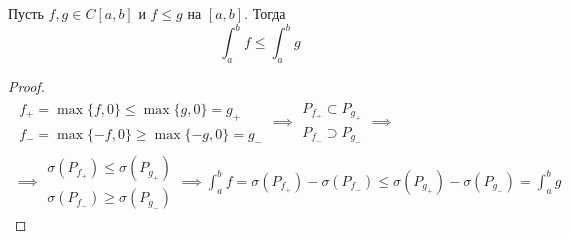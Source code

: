 \begin{theorem}
    Пусть $f, g \in C[a, b]$ и $f \leq g$ на $[a, b]$. Тогда
    \begin{equation*}
        \int_{a}^{b} f \leq \int_{a}^{b} g
    \end{equation*}
\end{theorem}
\begin{proof}
    \begin{equation*}
        \begin{gathered}
            \begin{gathered}
                f_{+} = \max\{f, 0\} \leq \max\{g, 0\} = g_{+} \\
                f_{-} = \max\{-f, 0\} \geq \max\{-g, 0\} = g_{-}
            \end{gathered}
            \implies
            \begin{gathered}
              P_{f_{+}} \subset P_{g_{+}} \\
              P_{f_{-}} \supset P_{g_{-}}
            \end{gathered}
            \implies \\ \implies
            \begin{gathered}
                \sigma(P_{f_{+}}) \leq \sigma(P_{g_{+}}) \\
                \sigma(P_{f_{-}}) \geq \sigma(P_{g_{-}})
            \end{gathered}
            \implies
            \int_{a}^{b} f = \sigma(P_{f_{+}}) - \sigma(P_{f_{-}}) \leq \sigma(P_{g_{+}}) - \sigma(P_{g_{-}}) = \int_{a}^{b} g
        \end{gathered}
    \end{equation*}
\end{proof}

